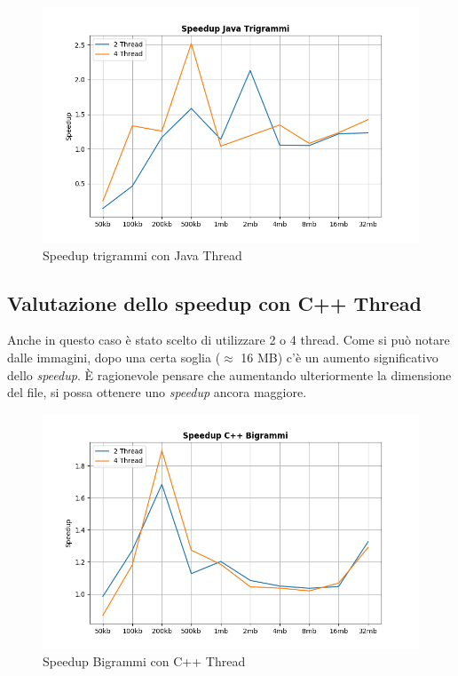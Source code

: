 \documentclass[10pt,twocolumn,letterpaper]{article}
\begin{document}
\begin{figure}[h]
\includegraphics[width=\linewidth]{Plots/speedup_java_trigrammi.png}
\caption{Speedup trigrammi con Java Thread}
\end{figure}

\newpage
\subsection{Valutazione dello speedup con C++ Thread}
Anche in questo caso è stato scelto di utilizzare 2 o 4 thread.
Come si può notare dalle immagini, dopo una certa soglia ($\approx$ 16 MB) c'è un aumento significativo dello \textit{speedup}. È ragionevole pensare che aumentando ulteriormente la dimensione del file, si possa ottenere uno \textit{speedup} ancora maggiore.

\begin{figure}[h]
\includegraphics[width=\linewidth]{Plots/speedup_cpp_bigrammi.png}
\caption{Speedup Bigrammi con C++ Thread}
\end{figure}
\end{document}
